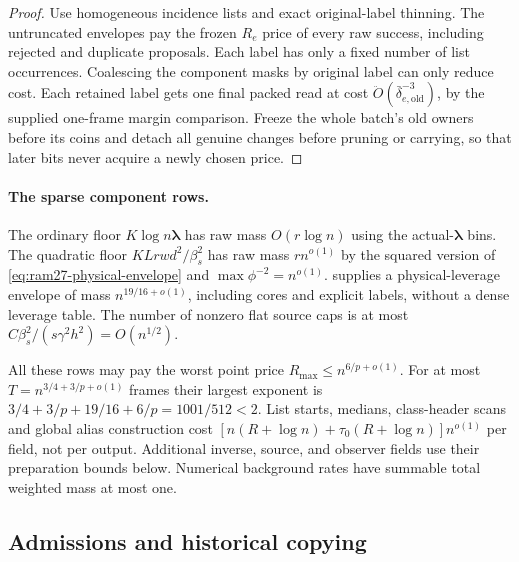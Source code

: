 \documentclass[11pt]{article}
\theoremstyle{remark}
\newcommand{\llambda}{\boldsymbol{\lambda}}
\renewcommand{\O}{\ddot{O}}
\begin{document}
\begin{proof}
Use homogeneous incidence lists and exact original-label thinning.
The untruncated envelopes pay the frozen $R_e$ price of every raw success,
including rejected and duplicate proposals.
Each label has only a fixed number of list occurrences.
Coalescing the component masks by original label can only reduce cost.
Each retained label gets one final packed read at cost
$\O(\bar\delta_{e,\mathrm{old}}^{-3})$, by the supplied one-frame margin
comparison.
Freeze the whole batch's old owners before its coins and detach all genuine
changes before pruning or carrying, so that later bits never acquire a newly
chosen price.
\end{proof}

\paragraph{The sparse component rows.}
The ordinary floor $K\log n\llambda$ has raw mass $O(r\log n)$ using the actual-$\llambda$
bins.
The quadratic floor $KLrwd^2/\beta_s^2$ has raw mass $rn^{o(1)}$ by the
squared version of \eqref{eq:ram27-physical-envelope} and
$\max\phi^{-2}=n^{o(1)}$.
 supplies a physical-leverage envelope of mass
$n^{19/16+o(1)}$, including cores and explicit labels, without a dense
leverage table.
The number of nonzero flat source caps is at most
$C\beta_s^2/(s\gamma^2h^2)=O(n^{1/2})$.

All these rows may pay the worst point price $R_{\max}\le n^{6/p+o(1)}$.
For at most $T=n^{3/4+3/p+o(1)}$ frames their largest exponent is
$3/4+3/p+19/16+6/p=1001/512<2$.
List starts, medians, class-header scans and global alias construction cost
$[n(R+\log n)+\tau_0(R+\log n)]n^{o(1)}$ per field, not per output.
Additional inverse, source, and observer fields use their preparation bounds
below.
Numerical background rates have summable total weighted mass at most one.

\subsection{Admissions and historical copying}
\end{document}
